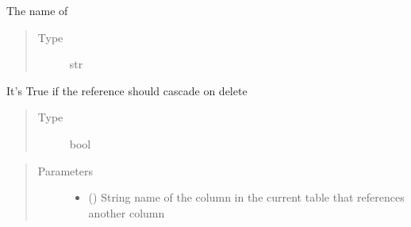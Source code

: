 \documentclass[letterpaper,10pt,english]{sphinxmanual}
\begin{document}
\begin{fulllineitems}
\begin{fulllineitems}
\begin{quote}
\begin{description}
\end{description}\end{quote}

\end{fulllineitems}


\begin{fulllineitems}
\label{\detokenize{model:mini_sql.model.foreign_key.ForeignKey.__to_column_str}}
\sphinxAtStartPar
The name of 
\begin{quote}\begin{description}
\item[{Type}] \leavevmode
\sphinxAtStartPar
str

\end{description}\end{quote}

\end{fulllineitems}


\begin{fulllineitems}
\label{\detokenize{model:mini_sql.model.foreign_key.ForeignKey.__on_delete_cascade}}
\sphinxAtStartPar
It’s True if the reference should cascade on delete
\begin{quote}\begin{description}
\item[{Type}] \leavevmode
\sphinxAtStartPar
bool

\end{description}\end{quote}

\end{fulllineitems}

\begin{quote}\begin{description}
\item[{Parameters}] \leavevmode\begin{itemize}
\item {} 
\sphinxAtStartPar
{} () \textendash{} String name of the column in the current table that references another column


\end{itemize}
\end{description}
\end{quote}
\end{fulllineitems}
\end{document}
